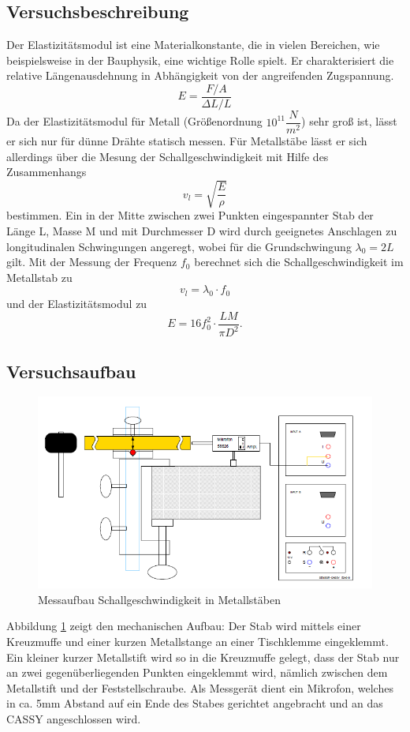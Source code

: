 \documentclass[12pt,a4paper]{article}
\begin{document}
\subsection{Versuchsbeschreibung}
Der Elastizitätsmodul ist eine Materialkonstante, die in vielen Bereichen, wie beispielsweise in der Bauphysik, eine wichtige Rolle spielt. Er charakterisiert die relative Längenausdehnung in Abhängigkeit von der angreifenden Zugspannung.
\begin{equation}
E = \dfrac{F/A}{\Delta L/L}
\end{equation}
Da der Elastizitätsmodul für Metall (Größenordnung $10^{11} \dfrac{N}{m^2}$) sehr groß ist, lässt er sich nur für dünne Drähte statisch messen. Für Metallstäbe lässt er sich allerdings über die Mesung der Schallgeschwindigkeit mit Hilfe des Zusammenhangs 
\begin{equation}
v_l = \sqrt{\dfrac{E}{\rho}}
\label{eq:001}
\end{equation}
bestimmen. Ein in der Mitte zwischen zwei Punkten eingespannter Stab der Länge L, Masse M und mit Durchmesser D wird durch geeignetes Anschlagen zu longitudinalen Schwingungen angeregt, wobei für die Grundschwingung $\lambda_0 = 2L$ gilt. Mit der Messung der Frequenz $f_0$ berechnet sich die Schallgeschwindigkeit im Metallstab zu
\begin{equation}
v_l = \lambda_0 \cdot f_0
\label{eq:002}
\end{equation}
und der Elastizitätsmodul zu
\begin{equation}
E = 16 f_0^2 \cdot \dfrac{L M}{\pi D^2}.
\label{eq:003}
\end{equation}
\subsection{Versuchsaufbau}
\begin{figure}
\includegraphics[scale=1]{Bilder/AufbauMessungSchallgeschwindigkeitMetallstab.PNG}
\centering
\caption{Messaufbau Schallgeschwindigkeit in Metallstäben}
\label{StabAufbau}
\end{figure}
Abbildung \ref{StabAufbau} zeigt den mechanischen Aufbau: Der Stab wird mittels einer Kreuzmuffe und einer kurzen Metallstange an einer Tischklemme eingeklemmt. Ein kleiner kurzer Metallstift wird so in die Kreuzmuffe gelegt, dass der Stab nur an zwei gegenüberliegenden Punkten eingeklemmt wird, nämlich zwischen dem Metallstift und der Feststellschraube. Als Messgerät dient ein Mikrofon, welches in ca. 5mm Abstand auf ein Ende des Stabes gerichtet angebracht und an das CASSY angeschlossen wird. 
\end{document}
